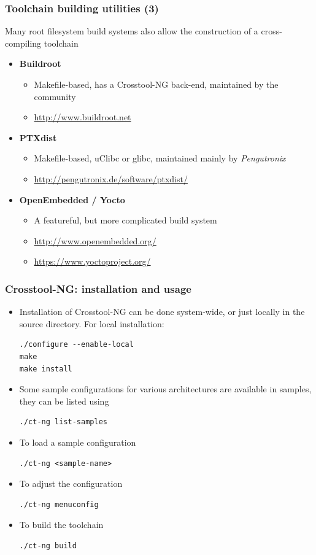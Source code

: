 \begin{frame}
\frametitle{Toolchain building utilities (3)}
Many root filesystem build systems also allow the construction of
a cross-compiling toolchain
\begin{itemize}
\item {\bf Buildroot}
  \begin{itemize}
  \item Makefile-based, has a Crosstool-NG back-end, maintained by the
    community
  \item \url{http://www.buildroot.net}
  \end{itemize}
\item {\bf PTXdist}
  \begin{itemize}
  \item Makefile-based, uClibc or glibc, maintained mainly by {\em Pengutronix}
  \item \url{http://pengutronix.de/software/ptxdist/}
  \end{itemize}
\item {\bf OpenEmbedded / Yocto}
  \begin{itemize}
  \item A featureful, but more complicated build system
  \item \url{http://www.openembedded.org/}
  \item \url{https://www.yoctoproject.org/}
  \end{itemize}
\end{itemize}
\end{frame}

\begin{frame}[fragile]
  \frametitle{Crosstool-NG: installation and usage}
  \begin{itemize}
  \item Installation of Crosstool-NG can be done system-wide, or just locally in
    the source directory. For local installation:
\begin{verbatim}
./configure --enable-local
make
make install
\end{verbatim}
  \item Some sample configurations for various architectures are
    available in
    samples, they can be listed using
\begin{verbatim}
./ct-ng list-samples
\end{verbatim}
  \item To load a sample configuration
\begin{verbatim}
./ct-ng <sample-name>
\end{verbatim}
  \item To adjust the configuration
\begin{verbatim}
./ct-ng menuconfig
\end{verbatim}
  \item To build the toolchain
\begin{verbatim}
./ct-ng build
\end{verbatim}
  \end{itemize}
\end{frame}

